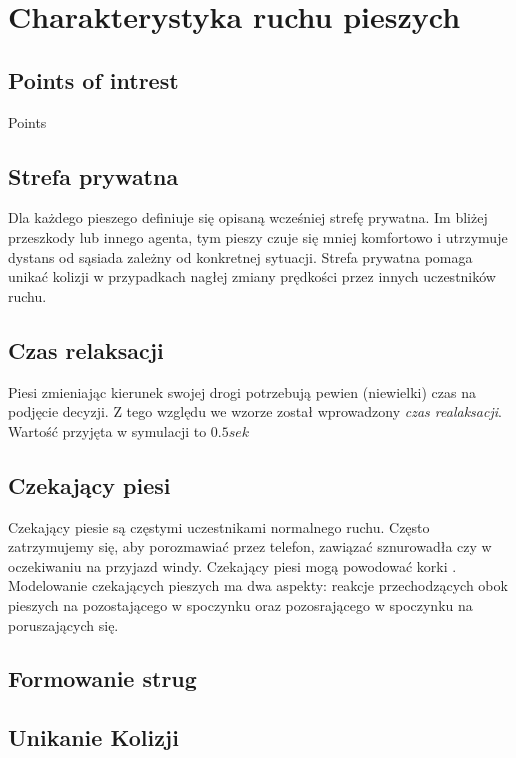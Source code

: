\chapter{Charakterystyka ruchu pieszych}
\label{cha:charakterystykaRuchu}

\section{Points of intrest}
\label{sec:pointsOfInterest}
 Points
 
\section{Strefa prywatna}
\label{sec:strefaPryw}

Dla każdego pieszego definiuje się opisaną wcześniej strefę prywatna.
Im bliżej przeszkody lub innego agenta, tym pieszy czuje się mniej komfortowo i utrzymuje dystans od sąsiada zależny od konkretnej sytuacji. Strefa prywatna pomaga unikać kolizji w przypadkach nagłej zmiany prędkości przez innych uczestników ruchu.

\section{Czas relaksacji}
\label{sec:czasRelaksacji}

Piesi zmieniając kierunek swojej drogi potrzebują pewien (niewielki) czas na podjęcie decyzji. Z tego względu we wzorze został wprowadzony \textit{czas realaksacji}. Wartość przyjęta w symulacji to $0.5 sek$

\section{Czekający piesi}
\label{sec:czekajacyPiesi}

Czekający piesie są częstymi uczestnikami normalnego ruchu. Często zatrzymujemy się, aby porozmawiać przez telefon, zawiązać sznurowadła czy w oczekiwaniu na przyjazd windy. Czekający piesi mogą powodować korki \cite{6}. Modelowanie czekających pieszych ma dwa aspekty: reakcje  przechodzących obok pieszych na pozostającego w spoczynku oraz pozosrającego w spoczynku na poruszających się.

\section{Formowanie strug}
\label{sec:strugi}

\section{Unikanie Kolizji}
\label{sec:kolizje}

